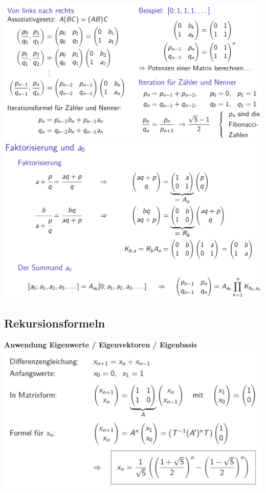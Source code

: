 		 \includegraphics[width=0.8\linewidth]{Bilder/kettenbruch4} \\
		 
		 \includegraphics[width=0.8\linewidth]{Bilder/kettenbruch5} \\

	\subsection{Rekursionsformeln}
		 \textbf{Anwendung Eigenwerte / Eigenvektoren / Eigenbasis} \\
		 \includegraphics[width=0.8\linewidth]{Bilder/rekursion1} \\ 


